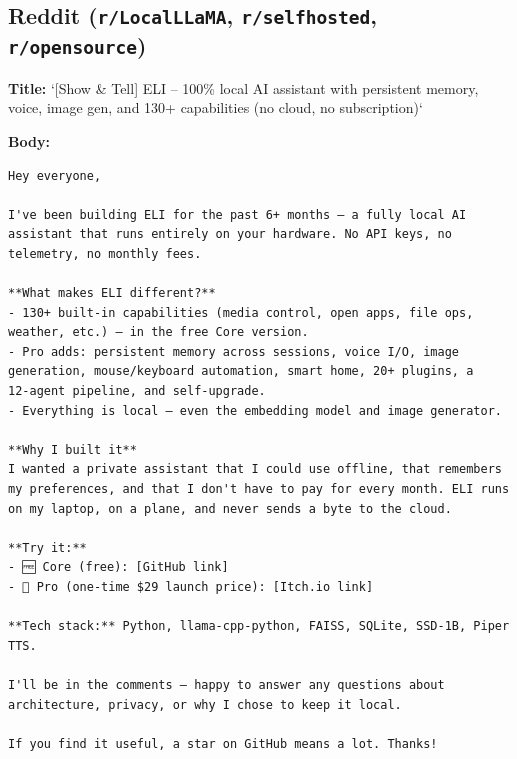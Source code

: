 \documentclass[11pt,a4paper]{article}
\begin{document}
\subsection{Reddit (\texttt{r/LocalLLaMA}, \texttt{r/selfhosted}, \texttt{r/opensource})}
\begin{tcolorbox}[title=Reddit Post, colback=blue!5]
\textbf{Title:} `[Show \& Tell] ELI – 100\% local AI assistant with persistent memory, voice, image gen, and 130+ capabilities (no cloud, no subscription)`

\textbf{Body:}
\small
\begin{verbatim}
Hey everyone,

I've been building ELI for the past 6+ months – a fully local AI assistant that runs entirely on your hardware. No API keys, no telemetry, no monthly fees.

**What makes ELI different?**
- 130+ built‑in capabilities (media control, open apps, file ops, weather, etc.) – in the free Core version.
- Pro adds: persistent memory across sessions, voice I/O, image generation, mouse/keyboard automation, smart home, 20+ plugins, a 12‑agent pipeline, and self‑upgrade.
- Everything is local – even the embedding model and image generator.

**Why I built it**
I wanted a private assistant that I could use offline, that remembers my preferences, and that I don't have to pay for every month. ELI runs on my laptop, on a plane, and never sends a byte to the cloud.

**Try it:**
- 🆓 Core (free): [GitHub link]
- 💎 Pro (one‑time $29 launch price): [Itch.io link]

**Tech stack:** Python, llama-cpp-python, FAISS, SQLite, SSD‑1B, Piper TTS.

I'll be in the comments – happy to answer any questions about architecture, privacy, or why I chose to keep it local.

If you find it useful, a star on GitHub means a lot. Thanks!
\end{verbatim}
\end{tcolorbox}
\end{document}
